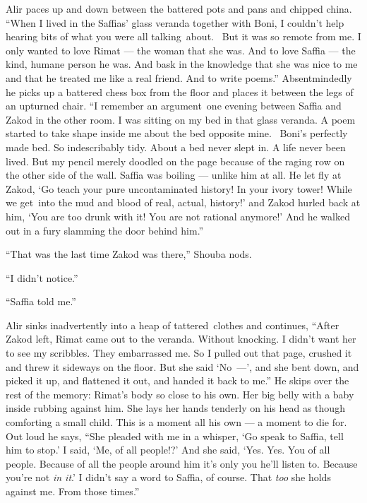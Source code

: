 \documentclass[twoside,11pt,openany]{book}
\begin{document}
Alir paces up and down between the battered pots and pans and chipped china. ``When I lived in the
Saffias{'} glass veranda together with Boni, I couldn't help hearing bits of what you were all talking~about.~ But
it was so remote from me. I only wanted to love Rimat --- the woman that she was. And to love Saffia --- the kind, humane
person he was. And bask in the knowledge that she was nice to me and that he treated me like a real friend. And to
write poems.'' Absentmindedly he picks up a battered chess box from the floor and places it between the
legs of an upturned chair. ``I remember an argument~one evening between Saffia and Zakod in the other
room. I was sitting on my bed in that glass veranda. A poem started to take shape inside me about the bed
opposite mine.~ Boni's perfectly made bed. So indescribably tidy. About a bed never slept in. A life never been
lived. But my pencil merely doodled on the page because of the raging row on the other side of the wall. Saffia was
boiling --- unlike him at all.  He let fly at Zakod, `Go teach your pure uncontaminated history! In your ivory tower!
While we get~into the mud and blood of real, actual, history!' and Zakod hurled back at him, `You are too drunk with
it! You are not rational anymore!{}' And he walked out in a fury slamming the door behind him.''

``That was the last time Zakod was there,'' Shouba nods.

``I didn't notice.''

``Saffia told me.''

Alir sinks inadvertently into a heap of tattered~clothes and continues, ``After Zakod left, Rimat came out
to the veranda. Without knocking. I didn't want her to see my scribbles. They embarrassed me. So I pulled out that
page, crushed it and threw it sideways on the floor.
But she said `No~---', and she bent down, and picked it up, and
flattened it out, and handed it back to me.'' He skips over the rest of the memory: Rimat's body so close
to his own. Her big belly with a baby inside rubbing against him. She lays her hands tenderly on his head as though
comforting a small child.  This is a moment all his own --- a moment to die for. Out loud he says, ``She
pleaded with me in a whisper, `Go speak to Saffia, tell him to stop.' I said, `Me, of all people!?' And she said,
`Yes. Yes. You of all people. Because of all the people around him it's only you he'll listen to. Because you're not
\textit{in it}.' I didn't say a word to Saffia, of course. That \textit{too} she holds against me. From those
times.''
\end{document}
